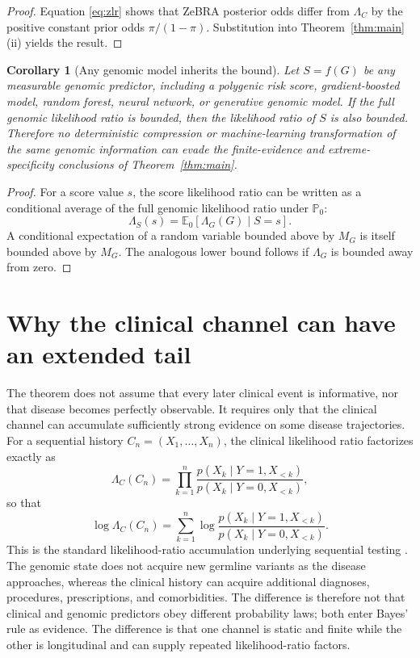 \documentclass[journal]{IEEEtran}
\newtheorem{corollary}{Corollary}
\newcommand{\Pzero}{\mathbb{P}_0}
\newcommand{\LR}{\Lambda}
\begin{document}
\begin{proof}
Equation \eqref{eq:zlr} shows that ZeBRA posterior odds differ from $\LR_C$ by the positive constant prior odds $\pi/(1-\pi)$. Substitution into Theorem~\ref{thm:main}(ii) yields the result.
\end{proof}

\begin{corollary}[Any genomic model inherits the bound]
Let $S=f(G)$ be any measurable genomic predictor, including a polygenic risk score, gradient-boosted model, random forest, neural network, or generative genomic model. If the full genomic likelihood ratio is bounded, then the likelihood ratio of $S$ is also bounded. Therefore no deterministic compression or machine-learning transformation of the same genomic information can evade the finite-evidence and extreme-specificity conclusions of Theorem~\ref{thm:main}.
\end{corollary}

\begin{proof}
For a score value $s$, the score likelihood ratio can be written as a conditional average of the full genomic likelihood ratio under $\Pzero$:
\begin{equation}
\LR_S(s)
=\mathbb{E}_0[\LR_G(G)\mid S=s].
\end{equation}
A conditional expectation of a random variable bounded above by $M_G$ is itself bounded above by $M_G$. The analogous lower bound follows if $\LR_G$ is bounded away from zero.
\end{proof}

\section{Why the clinical channel can have an extended tail}

The theorem does not assume that every later clinical event is informative, nor that disease becomes perfectly observable. It requires only that the clinical channel can accumulate sufficiently strong evidence on some disease trajectories. For a sequential history $C_n=(X_1,\ldots,X_n)$, the clinical likelihood ratio factorizes exactly as
\begin{equation}
\LR_C(C_n)
=\prod_{k=1}^{n}
\frac{p(X_k\mid Y=1,X_{<k})}
     {p(X_k\mid Y=0,X_{<k})},
\label{eq:sequentialLR}
\end{equation}
so that
\begin{equation}
\log\LR_C(C_n)
=\sum_{k=1}^{n}
\log
\frac{p(X_k\mid Y=1,X_{<k})}
     {p(X_k\mid Y=0,X_{<k})}.
\label{eq:sequentiallogLR}
\end{equation}
This is the standard likelihood-ratio accumulation underlying sequential testing \cite{Wald1945}. The genomic state does not acquire new germline variants as the disease approaches, whereas the clinical history can acquire additional diagnoses, procedures, prescriptions, and comorbidities. The difference is therefore not that clinical and genomic predictors obey different probability laws; both enter Bayes' rule as evidence. The difference is that one channel is static and finite while the other is longitudinal and can supply repeated likelihood-ratio factors.
\end{document}
